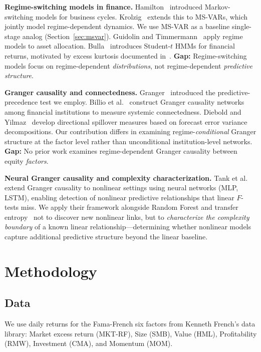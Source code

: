 \documentclass{uai2026}
\begin{document}
\textbf{Regime-switching models in finance.}
Hamilton~\cite{hamilton1989new} introduced Markov-switching models for business
cycles. Krolzig~\cite{krolzig1997markov} extends this to MS-VARs, which jointly
model regime-dependent dynamics. We use MS-VAR as a baseline single-stage analog
(Section~\ref{sec:msvar}).
Guidolin and Timmermann~\cite{guidolin2007asset} apply regime models to asset allocation.
Bulla~\cite{bulla2011hidden} introduces Student-$t$ HMMs for financial returns,
motivated by excess kurtosis documented in~\cite{cont2001empirical}.
\textbf{Gap:} Regime-switching models focus on regime-dependent \emph{distributions},
not regime-dependent \emph{predictive structure}.

\textbf{Granger causality and connectedness.}
Granger~\cite{granger1969investigating} introduced the predictive-precedence test
we employ. Billio et al.~\cite{billio2012econometric} construct Granger causality
networks among financial institutions to measure systemic connectedness.
Diebold and Yilmaz~\cite{diebold2012better} develop directional spillover measures
based on forecast error variance decompositions. Our contribution differs in
examining regime-\emph{conditional} Granger structure at the factor level rather
than unconditional institution-level networks.
\textbf{Gap:} No prior work examines regime-dependent Granger causality between
equity \emph{factors}.

\textbf{Neural Granger causality and complexity characterization.}
Tank et al.~\cite{tank2021neural} extend Granger causality to nonlinear settings
using neural networks (MLP, LSTM), enabling detection of nonlinear predictive
relationships that linear $F$-tests miss. We apply their framework alongside
Random Forest and transfer entropy~\cite{schreiber2000measuring} not to discover
new nonlinear links, but to \emph{characterize the complexity boundary} of
a known linear relationship---determining whether nonlinear models capture
additional predictive structure beyond the linear baseline.

\section{Methodology}

\subsection{Data}

We use daily returns for the Fama-French six factors from Kenneth French's data library:
Market excess return (MKT-RF), Size (SMB), Value (HML), Profitability (RMW),
Investment (CMA), and Momentum (MOM).
\end{document}
